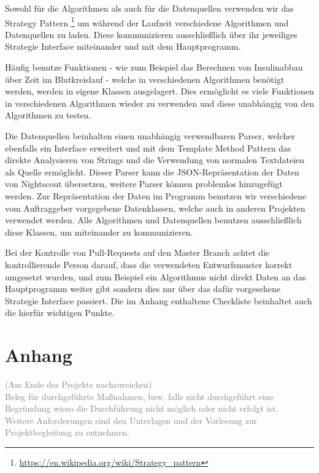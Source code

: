 \documentclass[accentcolor=tud0b,12pt,paper=a4]{tudreport}
\begin{document}
Sowohl für die Algorithmen als auch für die Datenquellen verwenden wir das Strategy Pattern \footnote{\url{https://en.wikipedia.org/wiki/Strategy_pattern}} um während der Laufzeit verschiedene Algorithmen und Datenquellen zu laden. Diese kommunizieren ausschließlich über ihr jeweiliges Strategie Interface miteinander und mit dem Hauptprogramm.

Häufig benutze Funktionen - wie zum Beispiel das Berechnen von Insulinabbau über Zeit im Blutkreislauf - welche in verschiedenen Algorithmen benötigt werden, werden in eigene Klassen ausgelagert. Dies ermöglicht es viele Funktionen in verschiedenen Algorithmen wieder zu verwenden und diese unabhängig von den Algorithmen zu testen.

Die Datenquellen beinhalten einen unabhängig verwendbaren Parser, welcher ebenfalls ein Interface erweitert und mit dem Template Method Pattern das direkte Analysieren von Strings und die Verwendung von normalen Textdateien als Quelle ermöglicht. Dieser Parser kann die JSON-Repräsentation der Daten von Nightscout übersetzen, weitere Parser können problemlos hinzugefügt werden. Zur Repräsentation der Daten im Programm benutzen wir verschiedene vom Auftraggeber vorgegebene Datenklassen, welche auch in anderen Projekten verwendet werden. Alle Algorithmen und Datenquellen benutzen ausschließlich diese Klassen, um miteinander zu kommunizieren.

Bei der Kontrolle von Pull-Requests auf den Master Branch achtet die kontrollierende Person darauf, dass die verwendeten Entwurfsmuster korrekt umgesetzt wurden, und zum Beispiel ein Algorithmus nicht direkt Daten an das Hauptprogramm weiter gibt sondern dies nur über das dafür vorgesehene Strategie Interface passiert. Die im Anhang enthaltene Checkliste beinhaltet auch die hierfür wichtigen Punkte.
	        
	
\appendix	
	\chapter{Anhang}
		
		\textcolor{gray}{(Am Ende des Projekts nachzureichen)}\\
		
		\textcolor{gray}{Beleg für durchgeführte Maßnahmen, bzw. falls nicht durchgeführt eine Begründung wieso die Durchführung nicht möglich oder nicht erfolgt ist. \\
		Weitere Anforderungen sind den Unterlagen und der Vorlesung zur Projektbegleitung zu entnehmen.}
	
\end{document}

